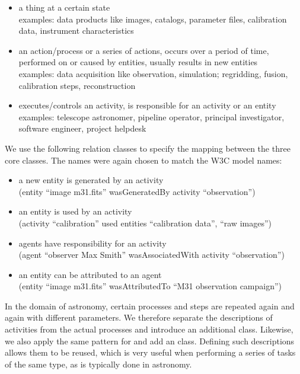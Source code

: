 \begin{itemize}
\item {} a thing at a certain state\\
    examples: data products like images, catalogs, parameter files, calibration data, instrument characteristics

\item {} an action/process or a series of actions, occurs over a period of time, performed on or caused by entities, usually results in new entities\\
    examples: data acquisition like observation, simulation; regridding, fusion, calibration steps, reconstruction

\item {} executes/controls an activity, is responsible for an activity or an entity\\
    examples: telescope astronomer, pipeline operator, principal investigator, software engineer, project helpdesk

\end{itemize}

\noindent

We use the following relation classes to specify the mapping between the three core 
classes. The names were again chosen to match the W3C model names:
\begin{itemize}
\item {} a new entity is generated by an activity\\
        (entity ``image m31.fits'' wasGeneratedBy activity ``observation'')
\item {} an entity is used by an activity\\
        (activity ``calibration'' used entities ``calibration data'', ``raw images'')
\item {} agents have responsibility for an activity\\
        (agent ``observer Max Smith'' wasAssociatedWith activity ``observation'')
\item {} an entity can be attributed to an agent\\
		(entity ``image m31.fits'' wasAttributedTo ``M31 observation campaign'')
\end{itemize}


In the domain of astronomy, certain processes and steps are repeated again and 
again with different parameters. We therefore separate the descriptions of activities
from the actual processes and introduce an additional  class.
Likewise, we also apply the same pattern for  and add an 
class.
Defining such descriptions allows them to be reused, which is very useful 
when performing a series of tasks of the same type, as is typically done in 
astronomy. 

